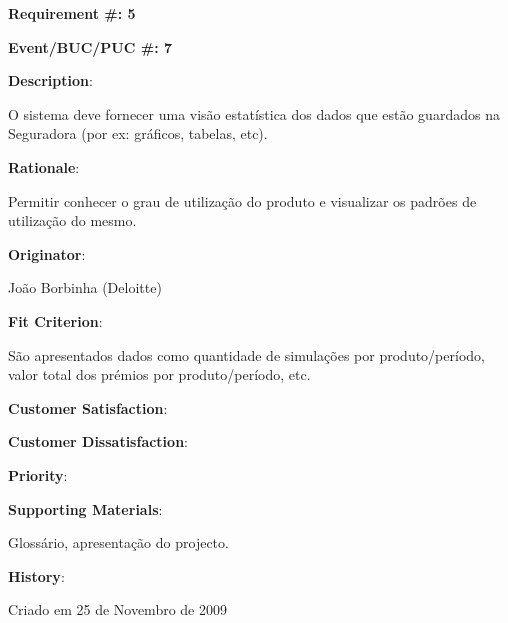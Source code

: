 \pagebreak

\begin{minipage}{0.55\textwidth}
\begin{flushleft}\textbf{Requirement \#: 5}\end{flushleft}
\end{minipage}
\begin{minipage}{0.4\textwidth}
\begin{flushright}\textbf{Event/BUC/PUC \#: 7}\end{flushright}
\end{minipage}

\begin{description}
\item \textbf{Description}:

O sistema deve fornecer uma visão estatística dos dados que estão guardados na Seguradora (por ex: gráficos, tabelas, etc).\\

\item \textbf{Rationale}:

Permitir conhecer o grau de utilização do produto e visualizar os padrões de utilização do mesmo.\\

\item \textbf{Originator}:

João Borbinha (Deloitte)\\

\item \textbf{Fit Criterion}:

São apresentados dados como quantidade de simulações por produto/período, valor total dos prémios por produto/período, etc.\\

\begin{minipage}{0.45\textwidth}
\begin{flushleft}\item \textbf{Customer Satisfaction}:\end{flushleft}
\end{minipage}
\begin{minipage}{0.45\textwidth}
\begin{flushleft}\item \textbf{Customer Dissatisfaction}:\end{flushleft}
\end{minipage}

\item \textbf{Priority}:\\

\item \textbf{Supporting Materials}:

Glossário, apresentação do projecto.\\

\item \textbf{History}:

Criado em 25 de Novembro de 2009\\
\end{description}

